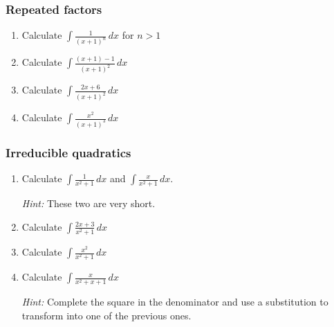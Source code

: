 \documentclass[14pt]{beamer}
\begin{document}
	\begin{frame}[t]
		\fontsize{13}{13}\selectfont
		\frametitle{Repeated factors}

		\begin{enumerate}
			\item Calculate $\displaystyle \int \frac{1}{(x+1)^{n}}\, dx$ \quad for $n
				>1$
				\vspace{.2cm}

			\item Calculate $\displaystyle \int \frac{(x+1) - 1}{(x+1)^{2}}\, dx$
				\vspace{.2cm}

			\item Calculate $\displaystyle \int \frac{2x + 6}{(x+1)^{2}}\, dx$
				\vspace{.2cm}

			\item Calculate $\displaystyle \int \frac{x^{2}}{(x+1)^{3}}\, dx$
		\end{enumerate}
	\end{frame}

	\begin{frame}[t]
		\fontsize{13}{13}\selectfont
		\frametitle{Irreducible quadratics}

		\begin{enumerate}
			\item Calculate $\displaystyle \int \frac{1}{x^{2}+ 1}\, dx$ and $\displaystyle
				\int \frac{x}{x^{2}+1}\, dx$.
				\vspace{.2cm}

				\emph{Hint:} These two are very short.
				\vspace{.2cm}

			\item Calculate $\displaystyle \int \frac{2x+ 3}{x^{2}+ 1}\, dx$
				\vspace{.2cm}

			\item Calculate $\displaystyle \int \frac{x^{2}}{x^{2}+ 1}\, dx$
				\vspace{.2cm}

			\item Calculate $\displaystyle \int \frac{x}{x^{2}+ x + 1 }\, dx$
				\vspace{.2cm}

				\emph{Hint:} Complete the square in the denominator and use a substitution
				to transform into one of the previous ones.
		\end{enumerate}
	\end{frame}
\end{document}
